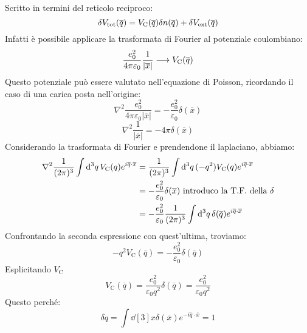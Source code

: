 Scritto in termini del reticolo reciproco:
\begin{equation*}
    \delta V_{\text{tot}}(\overline q)=V_{\text C}(\overline q)\delta n (\overline q)+\delta V_{\text{ext}}(\overline q)
\end{equation*}
Infatti è possibile applicare la trasformata di Fourier al potenziale coulombiano:
\begin{equation*}
    \frac{e_0^2}{4\pi\varepsilon_0}\frac{1}{|\overline x|} \longrightarrow V_{\text C}(\overline q)
\end{equation*}
Questo potenziale può essere valutato nell'equazione di Poisson, ricordando il caso di una carica posta nell'origine:
\begin{equation*}
    \nabla^2 \frac{e_0^2}{4\pi\varepsilon_0|\overline{x}|}=-\frac{e_0^2}{\varepsilon_0}\delta(\overline x)
\end{equation*}
\begin{equation*}
    \nabla^2 \frac{1}{|\overline x|}= -4\pi\delta(\overline x)
\end{equation*}
Considerando la trasformata di Fourier e prendendone il laplaciano, abbiamo:
\begin{equation*}
    \begin{aligned}
        \nabla^2\frac{1}{(2\pi)^3}\int \dd[3]{q}V_{\text C}(q)e^{i\overline q \cdot \overline x} & =\frac{1}{(2\pi)^3}\int \dd[3]{q}(-q^2)V_{\text C}(q)e^{i\overline q \cdot \overline x} \\
        & = -\frac{e_0^2}{\varepsilon_0}\delta(\overline x) \text{ introduco la T.F. della } \delta\\
        & = -\frac{e_0^2}{\varepsilon_0}\frac{1}{(2\pi)^3}\int \dd[3]{q}\delta(\overline q)e^{i \overline q \cdot \overline x}
    \end{aligned}
\end{equation*}
Confrontando la seconda espressione con quest'ultima, troviamo:
\begin{equation*}
    -q^2V_{\text{C}}(\overline q)=-\frac{e_0^2}{\varepsilon_0}\delta(\overline q)
\end{equation*}
Esplicitando $V_{\text{C}}$
\begin{equation*}
    V_{\text{C}}(\overline q) = \frac{e_0^2}{\varepsilon_0 q^2}\delta(\overline q) = \frac{e_0^2}{\varepsilon_0 q^2}
\end{equation*}
Questo perché:
\begin{equation*}
    \delta q = \int \dd[3]{x} \delta(\overline x) e^{-i\overline q \cdot \overline x}=1
\end{equation*}
